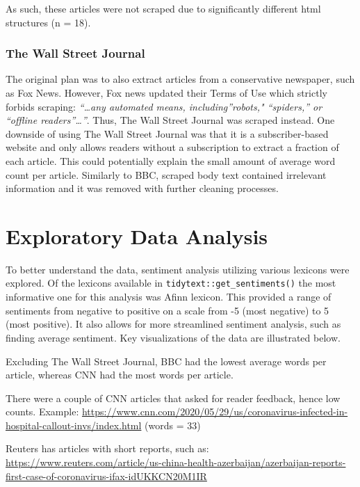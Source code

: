 \documentclass[
]{article}
\begin{document}
As such, these articles were not scraped due to significantly different
html structures (n = 18).

\hypertarget{the-wall-street-journal}{%
\subsubsection{The Wall Street Journal}\label{the-wall-street-journal}}

The original plan was to also extract articles from a conservative
newspaper, such as Fox News. However, Fox news updated their Terms of
Use which strictly forbids scraping: \emph{``\ldots any automated means,
including''robots," ``spiders,'' or ``offline readers''\ldots''}. Thus,
The Wall Street Journal was scraped instead. One downside of using The
Wall Street Journal was that it is a subscriber-based website and only
allows readers without a subscription to extract a fraction of each
article. This could potentially explain the small amount of average word
count per article. Similarly to BBC, scraped body text contained
irrelevant information and it was removed with further cleaning
processes.

\hypertarget{exploratory-data-analysis}{%
\section{Exploratory Data Analysis}\label{exploratory-data-analysis}}

To better understand the data, sentiment analysis utilizing various
lexicons were explored. Of the lexicons available in
\texttt{tidytext::get\_sentiments()} the most informative one for this
analysis was Afinn lexicon. This provided a range of sentiments from
negative to positive on a scale from -5 (most negative) to 5 (most
positive). It also allows for more streamlined sentiment analysis, such
as finding average sentiment. Key visualizations of the data are
illustrated below.

Excluding The Wall Street Journal, BBC had the lowest average words per
article, whereas CNN had the most words per article.

There were a couple of CNN articles that asked for reader feedback,
hence low counts. Example:
\url{https://www.cnn.com/2020/05/29/us/coronavirus-infected-in-hospital-callout-invs/index.html}
(words = 33)

Reuters has articles with short reports, such as:
\url{https://www.reuters.com/article/us-china-health-azerbaijan/azerbaijan-reports-first-case-of-coronavirus-ifax-idUKKCN20M1IR}
\end{document}
